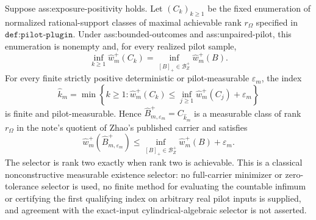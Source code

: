 Suppose ass:exposure-positivity holds.  Let \((C_k)_{k\ge1}\) be the fixed enumeration of normalized rational-support classes of maximal achievable rank \(r_\Omega\) specified in \(\texttt{def:pilot-plugin}\).  Under ass:bounded-outcomes and ass:unpaired-pilot, this enumeration is nonempty and, for every realized pilot sample,
\[
 \inf_{k\ge1}\widehat w_m^+(C_k)
 =\inf_{[B]_+\in\mathcal B_Z^+}\widehat w_m^+(B).
\]
For every finite strictly positive deterministic or pilot-measurable \(\varepsilon_m\), the index
\[
 \widehat k_m=
 \min\left\{k\ge1:
 \widehat w_m^+(C_k)
 \le \inf_{j\ge1}\widehat w_m^+(C_j)+\varepsilon_m
 \right\}
\]
is finite and pilot-measurable.  Hence \(\widehat B_{m,\varepsilon_m}^+=C_{\widehat k_m}\) is a measurable class of rank \(r_\Omega\) in the note's quotient of Zhao's published carrier and satisfies
\[
 \widehat w_m^+(\widehat B_{m,\varepsilon_m}^+)
 \le
 \inf_{[B]_+\in\mathcal B_Z^+}\widehat w_m^+(B)+\varepsilon_m.
\]
The selector is rank two exactly when rank two is achievable.  This is a classical nonconstructive measurable existence selector: no full-carrier minimizer or zero-tolerance selector is used, no finite method for evaluating the countable infimum or certifying the first qualifying index on arbitrary real pilot inputs is supplied, and agreement with the exact-input cylindrical-algebraic selector is not asserted.